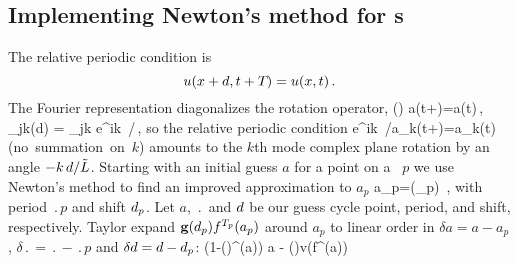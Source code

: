 %


\subsection{Implementing Newton's method  for \rpo s}
\label{sec:NewtRPOs}

The relative periodic condition is
\[
    u(x+d,t+{T_{}})=u(x,t)
        \,.
\]
The Fourier representation diagonalizes the rotation operator, 
\beq
    (\shift)  a(t+\period{})=a(t)\,,\qquad
            _{jk}(d) = \delta_{jk} e^{ik\, \shift/\tildeL}\,,
    \label{eq:RPO}
\eeq
so the relative periodic condition
\beq
    e^{ik\, \shift /\tildeL}a_k(t+\period{})=a_k(t)  %
    \qquad \mbox{(no summation on $k$)}
    \label{eq:RPOcondition}
\eeq
amounts to the $k$th mode complex plane rotation by an 
angle $-k\, d /\tilde{L}$.
Starting with an initial guess $a$ for a point on a \rpo\ $p$
we use Newton's method to find an improved approximation to $a_p$ 
\beq
    a_p=(\shift_p)   \,,
    \label{eq:RPOcond}
\eeq
with period $\period{p}$ and shift $d_p$. Let 
$a$, $\period{}$ and $d$ 
be our guess cycle point, period, and shift, respectively. 
Taylor expand $\mathbf{g}(d_p)  {f^{{T_{p}}}(a_p)}$ 
around $a_p$ to linear order in
$\delta a=a-a_p$, $\delta \period{}=\period{} - \period{p}$ and 
$\delta d=d-d_p$:
% 
% 
\beq
    \left({1}-(\shift)\jMps^{\period{}}(a)\right) \delta a 
   - (\shift)v(f^{\period{}}(a)) \delta \period{} 
